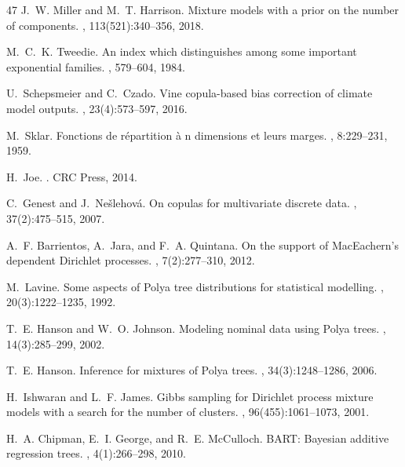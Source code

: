 \documentclass[11pt, a4paper]{article}
\begin{document}
\begin{thebibliography}{47}
J.~W. Miller and M.~T. Harrison.
\newblock Mixture models with a prior on the number of components.
, 113(521):340--356, 2018.

M.~C.~K. Tweedie.
\newblock An index which distinguishes among some important exponential families.
, 579--604, 1984.

U.~Schepsmeier and C.~Czado.
\newblock Vine copula-based bias correction of climate model outputs.
, 23(4):573--597, 2016.

M.~Sklar.
\newblock Fonctions de r{\'e}partition {\`a} n dimensions et leurs marges.
, 8:229--231, 1959.

H.~Joe.
.
\newblock CRC Press, 2014.

C.~Genest and J.~Ne{\v{s}}lehov{\'a}.
\newblock On copulas for multivariate discrete data.
, 37(2):475--515, 2007.

A.~F. Barrientos, A.~Jara, and F.~A. Quintana.
\newblock On the support of MacEachern's dependent Dirichlet processes.
, 7(2):277--310, 2012.

M.~Lavine.
\newblock Some aspects of Polya tree distributions for statistical modelling.
, 20(3):1222--1235, 1992.

T.~E. Hanson and W.~O. Johnson.
\newblock Modeling nominal data using Polya trees.
, 14(3):285--299, 2002.

T.~E. Hanson.
\newblock Inference for mixtures of Polya trees.
, 34(3):1248--1286, 2006.

H.~Ishwaran and L.~F. James.
\newblock Gibbs sampling for Dirichlet process mixture models with a search for the number of clusters.
, 96(455):1061--1073, 2001.

H.~A. Chipman, E.~I. George, and R.~E. McCulloch.
\newblock BART: Bayesian additive regression trees.
, 4(1):266--298, 2010.


\end{thebibliography}
\end{document}
